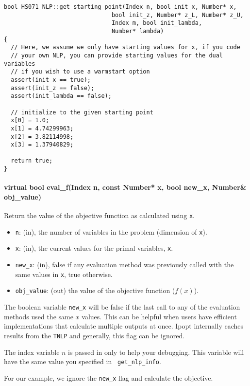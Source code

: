 \documentclass[letter,10pt]{article}
\begin{document}
{\begin{verbatim}
bool HS071_NLP::get_starting_point(Index n, bool init_x, Number* x,
                               bool init_z, Number* z_L, Number* z_U,
                               Index m, bool init_lambda,
                               Number* lambda)
{
  // Here, we assume we only have starting values for x, if you code
  // your own NLP, you can provide starting values for the dual variables
  // if you wish to use a warmstart option
  assert(init_x == true);
  assert(init_z == false);
  assert(init_lambda == false);

  // initialize to the given starting point
  x[0] = 1.0;
  x[1] = 4.74299963;
  x[2] = 3.82114998;
  x[3] = 1.37940829;

  return true;
}
\end{verbatim}

\paragraph{virtual bool eval\_f(Index n, const Number* x, 
                bool new\_x, Number\& obj\_value)} 
$\;$ \\
Return the value of the objective function as calculated using {\tt x}.
\begin{itemize}
\item {\tt n}: (in), the number of variables in the problem (dimension of {\tt x}). 
\item {\tt x}: (in), the current values for the primal variables, {\tt x}.
\item {\tt new\_x}: (in), false if any evaluation method was previously called 
        with the same values in {\tt x}, true otherwise.
\item {\tt obj\_value}: (out) the value of the objective function ($f(x)$).
\end{itemize}

The boolean variable {\tt new\_x} will be false if the last call to
any of the evaluation methods used the same $x$ values. This can be
helpful when users have efficient implementations that calculate
multiple outputs at once. Ipopt internally caches results from the
{\tt TNLP} and generally, this flag can be ignored.

The index variable $n$ is passed in only to help your debugging. This
variable will have the same value you specified in {\tt
get\_nlp\_info}.

For our example, we ignore the {\tt new\_x} flag and calculate the objective.

}
\end{document}
